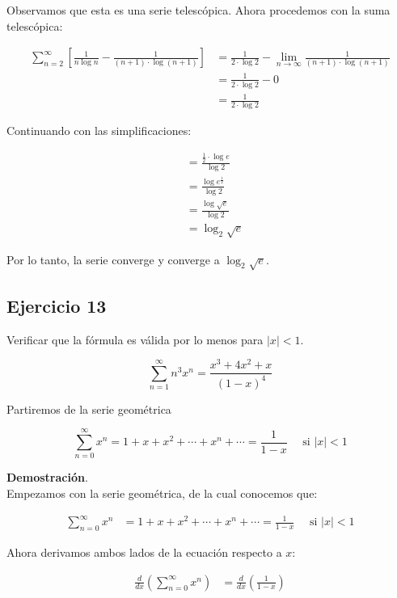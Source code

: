 \documentclass{article}
\begin{document}
    Observamos que esta es una serie telescópica. Ahora procedemos con la suma telescópica:

    \begin{align*}
    \sum_{n=2}^{\infty}\left[\frac{1}{n \log n}-\frac{1}{(n+1) \cdot \log (n+1)}\right] & =\frac{1}{2 \cdot \log 2}-\lim _{n \rightarrow \infty} \frac{1}{(n+1) \cdot \log (n+1)} \\
    & =\frac{1}{2 \cdot \log 2}-0 \\
    & =\frac{1}{2 \cdot \log 2}
    \end{align*}

    Continuando con las simplificaciones:

    \begin{align*}
    & =\frac{\frac{1}{2} \cdot \log e}{\log 2} \\
    & =\frac{\log e^{\frac{1}{2}}}{\log 2} \\
    & =\frac{\log \sqrt{e}}{\log 2} \\
    & =\log _{2} \sqrt{e}
    \end{align*}

    Por lo tanto, la serie converge y converge a $\log _{2} \sqrt{e}$.

    \subsection*{Ejercicio 13}

    Verificar que la fórmula es válida por lo menos para $|x|<1$.

    $$
    \sum_{n=1}^{\infty} n^{3} x^{n}=\frac{x^{3}+4 x^{2}+x}{(1-x)^{4}}
    $$

    Partiremos de la serie geométrica

    $$
    \sum_{n=0}^{\infty} x^{n}=1+x+x^{2}+\cdots+x^{n}+\cdots=\frac{1}{1-x} \quad \text { si }|x|<1
    $$

    \textbf{Demostración}.\\

    Empezamos con la serie geométrica, de la cual conocemos que:

    \begin{align*}
        \sum_{n=0}^{\infty} x^{n} &= 1 + x + x^2 + \cdots + x^n + \cdots = \frac{1}{1-x} \quad \text{ si } |x| < 1
    \end{align*}

    Ahora derivamos ambos lados de la ecuación respecto a \(x\):

    \begin{align*}
        \frac{d}{dx} \left(\sum_{n=0}^{\infty} x^{n}\right) &= \frac{d}{dx} \left( \frac{1}{1-x} \right)
    \end{align*}
\end{document}
